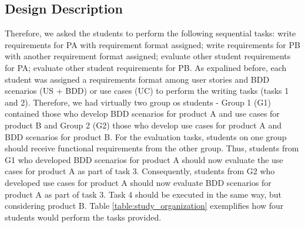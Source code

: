 \subsection{Design Description}
Therefore, we asked the students to perform the following sequential tasks: write requirements for PA with requirement format assigned; write requirements for PB with another requirement format assigned; evaluate other student requirements for PA; evaluate other student requirements for PB. As expalined before, each student was assigned a requirements format among user stories and BDD scenarios (US + BDD) or use cases (UC) to perform the writing tasks (tasks 1 and 2). Therefore, we had virtually two group os students - Group 1 (G1) contained those who develop BDD scenarios for product A and use cases for product B and Group 2 (G2) those who develop use cases for product A and BDD scenarios for product B. For the evaluation tasks, students on one group should receive functional requirements from the other group. Thus, students from G1 who developed BDD scenarios for product A should now evaluate the use cases for product A as part of task 3. Consequently, students from G2 who developed use cases for product A should now evaluate BDD scenarios for product A as part of task 3. Task 4 should be executed in the same way, but considering product B. Table \ref{table:study_organization} exemplifies how four students would perform the tasks provided. 

